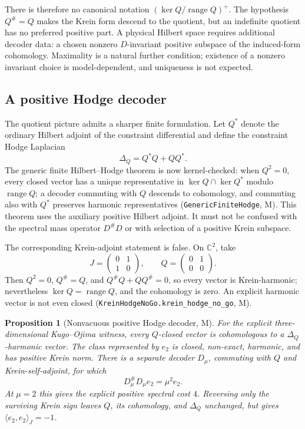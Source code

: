 \documentclass[11pt]{article}
\newcommand{\Mtag}{\textcolor{verified}{\textsc{M}}}
\newcommand{\C}{\mathbb{C}}
\newtheorem{proposition}[theorem]{Proposition}
\begin{document}
There is therefore no canonical notation $(\ker Q/\operatorname{range}Q)^+$.
The hypothesis $Q^\#=Q$ makes the Krein form descend to the quotient, but an
indefinite quotient has no preferred positive part.  A physical Hilbert space
requires additional decoder data: a chosen nonzero $D$-invariant positive
subspace of the induced-form cohomology.  Maximality is a natural further
condition; existence of a nonzero invariant choice is model-dependent, and
uniqueness is not expected.

\subsection{A positive Hodge decoder}

The quotient picture admits a sharper finite formulation.  Let $Q^*$ denote
the ordinary Hilbert adjoint of the constraint differential and define the
constraint Hodge Laplacian
\begin{equation}\label{eq:constraintHodge}
  \Delta_Q=Q^*Q+QQ^*.
\end{equation}
The generic finite Hilbert--Hodge theorem is now kernel-checked: when $Q^2=0$,
every closed vector has a unique representative in
$\ker Q\cap\ker Q^*$ modulo $\operatorname{range}Q$; a decoder commuting with
$Q$ descends to cohomology, and commuting also with $Q^*$ preserves harmonic
representatives (\texttt{GenericFiniteHodge}, \Mtag).  This theorem uses the
auxiliary positive Hilbert adjoint.  It must not be confused with the spectral
mass operator $D^\#D$ or with selection of a positive Krein subspace.

The corresponding Krein-adjoint statement is false.  On $\C^2$, take
\[
 J=\begin{pmatrix}0&1\\1&0\end{pmatrix},\qquad
 Q=\begin{pmatrix}0&1\\0&0\end{pmatrix}.
\]
Then $Q^2=0$, $Q^\#=Q$, and $Q^\#Q+QQ^\#=0$, so every vector is
Krein-harmonic; nevertheless $\ker Q=\operatorname{range}Q$, and the
cohomology is zero.  An explicit harmonic vector is not even closed
(\texttt{KreinHodgeNoGo.krein\_hodge\_no\_go}, \Mtag).

\begin{proposition}[Nonvacuous positive Hodge decoder, \Mtag]
For the explicit three-dimensional Kugo--Ojima witness, every $Q$-closed vector
is cohomologous to a $\Delta_Q$-harmonic vector.  The class represented by
$e_2$ is closed, non-exact, harmonic, and has positive Krein norm.  There is a
separate decoder $D_\mu$, commuting with $Q$ and Krein-self-adjoint, for which
\begin{equation}\label{eq:positiveHodgeMass}
  D_\mu^\#D_\mu e_2=\mu^2e_2.
\end{equation}
At $\mu=2$ this gives the explicit positive spectral cost $4$.  Reversing only
the surviving Krein sign leaves $Q$, its cohomology, and $\Delta_Q$ unchanged,
but gives $\langle e_2,e_2\rangle_J=-1$.
\end{proposition}
\end{document}
